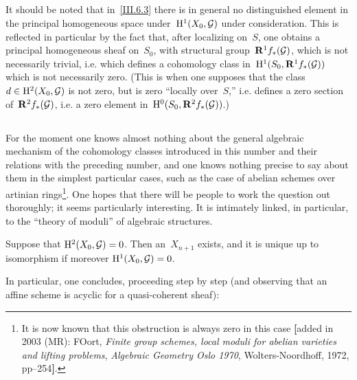 \setcounter{subsection}{\value{theorem}}
\subsection{}
\label{III.6.5}
It should be noted that in~\ref{III.6.3} there is in general no distinguished element in the principal homogeneous space under~$\mathrm{H}^1(X_0,\mathcal{G})$ under consideration. This is reflected in particular by the fact that, after localizing on~$S$, one obtains a principal homogeneous sheaf on~$S_0$, with structural group~$\mathbf{R}^1f_*(\mathcal{G})$, which is not necessarily trivial, i.e. which defines a cohomology class in~$\mathrm{H}^1(S_0,\mathbf{R}^1f_*(\mathcal{G}))$ which is not necessarily zero. (This is when one supposes that the class~$d\in\mathrm{H}^2(X_0,\mathcal{G})$ is not zero, but is zero ``locally over~$S$,'' i.e. defines a zero section of~$\mathbf{R}^2f_*(\mathcal{G})$, i.e. a zero element in~$\mathrm{H}^0(S_0,\mathbf{R}^2f_*(\mathcal{G}))$.)

\subsection{}
\label{III.6.6}
For the moment one knows almost nothing about the general algebraic mechanism of the cohomology classes introduced in this number and their relations with the preceding number, and one knows nothing precise to say about them in the simplest particular cases, such as the case of abelian schemes over artinian rings\footnote{\label{III.6.6.p24}%
It is now known that this obstruction is always zero in this case \textbf{[}added in 2003 (MR): \cf F\ptbl Oort, \emph{Finite group schemes, local moduli for abelian varieties and lifting problems}, \emph{Algebraic Geometry Oslo 1970}, Wolters-Noordhoff, 1972, pp--254\textbf{]}.}. One hopes that there will be people to work the question out thoroughly; it seems particularly interesting. It is intimately linked, in particular, to the ``theory of moduli'' of algebraic structures.

\setcounter{theorem}{\value{subsection}}
\begin{corollary}
\label{III.6.7}
Suppose that $\mathrm{H}^2(X_0,\mathcal{G})=0$. Then an~$X_{n+1}$ exists, and it is unique up to isomorphism if moreover $\mathrm{H}^1(X_0,\mathcal{G})=0$.
\end{corollary}

In particular, one concludes, proceeding step by step (and observing that an affine scheme is acyclic for a quasi-coherent sheaf):


